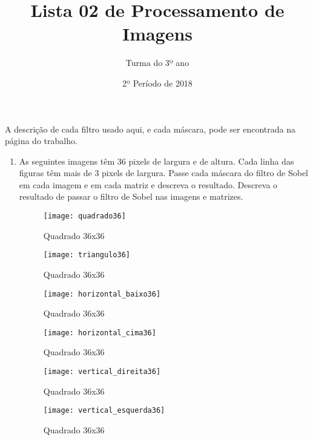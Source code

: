 \documentclass[12pt]{article}
\title{Lista 02 de Processamento de Imagens}
\date{2º Período de 2018}
\author{Turma do 3º ano}
\begin{document}
\maketitle


\vspace{3em}


A descrição de cada filtro usado aqui, e cada máscara, pode ser encontrada na página do trabalho.

\begin{enumerate}

\item As seguintes imagens têm 36 pixels de largura e de altura. 
Cada linha das figuras têm mais de 3 pixels de largura. 
Passe cada máscara do filtro de Sobel em cada imagem e em cada matriz e descreva o resultado.
Descreva o resultado de passar o filtro de Sobel nas imagens e matrizes.

\begin{figure}[ht]
    \centering
    \texttt{[image: quadrado36]}
    \caption{Quadrado 36x36}
    \label{fig:quadrado36}
\end{figure}

\begin{figure}[ht]
    \centering
    \texttt{[image: triangulo36]}
    \caption{Quadrado 36x36}
    \label{fig:quadrado36}
\end{figure}

\begin{figure}[ht]
    \centering
    \texttt{[image: horizontal\_baixo36]}
    \caption{Quadrado 36x36}
    \label{fig:quadrado36}
\end{figure}

\begin{figure}[ht]
    \centering
    \texttt{[image: horizontal\_cima36]}
    \caption{Quadrado 36x36}
    \label{fig:quadrado36}
\end{figure}

\begin{figure}[ht]
    \centering
    \texttt{[image: vertical\_direita36]}
    \caption{Quadrado 36x36}
    \label{fig:quadrado36}
\end{figure}

\begin{figure}[ht]
    \centering
    \texttt{[image: vertical\_esquerda36]}
    \caption{Quadrado 36x36}
    \label{fig:quadrado36}
\end{figure}


\end{enumerate}
\end{document}
